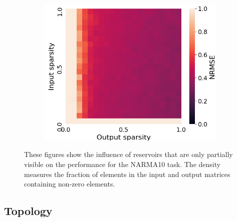 \begin{figure}[htbp]
\begin{subfigure}{.3\textwidth}
  \end{subfigure}
  \begin{subfigure}{.3\textwidth}
    \centering
    \includegraphics[width=\linewidth]{img/partial_visibility.png}
  \end{subfigure}
  \caption{
    These figures show the influence of reservoirs that are only partially
visible on the performance for the NARMA10 task. The density measures the
fraction of elements in the input and output matrices containing non-zero
elements.
  }
  \label{performance}
\end{figure}


\subsection{Topology}



